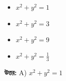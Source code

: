 \documentclass[12pt, a4paper]{article}
\begin{document}
\begin{itemize}[label={}, leftmargin=1cm, itemsep=0.5em]
    \item[\textbf{A)}] $x^2 + y^2 = 1$
    \item[\textbf{B)}] $x^2 + y^2 = 3$
    \item[\textbf{C)}] $x^2 + y^2 = 9$
    \item[\textbf{D)}] $x^2 + y^2 = \frac{1}{3}$
\end{itemize}

\vspace{0.5em}
\begin{tcolorbox}[answerbox]
    \textbf{\color{success} উত্তর:} A) $x^2 + y^2 = 1$
\end{tcolorbox}
\vspace{1em}
\end{document}
